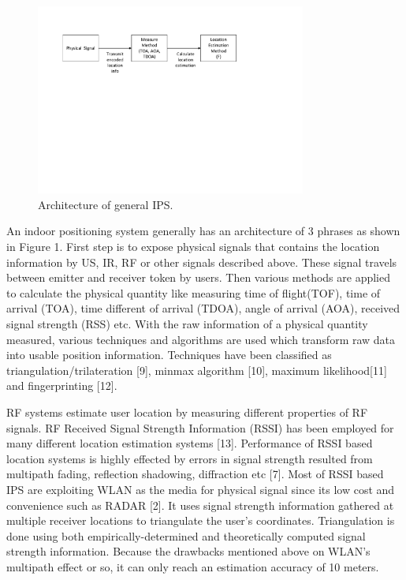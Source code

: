 \documentclass[conference]{IEEEtran}
\begin{document}
	\begin{figure}
	\centering
	\includegraphics[width=3.5in]{../img.origin/fig1.pdf}
	\caption{Architecture of general IPS.}
	\label{fig_sim}
	\end{figure}

An indoor positioning system generally has an architecture of 3 phrases as shown in Figure 1. First step is to expose physical signals that contains the location information by US, IR, RF or other signals described above. These signal travels between emitter and receiver token by users. Then various methods are applied to calculate the physical quantity like measuring time of flight(TOF), time of arrival (TOA), time different of arrival (TDOA), angle of arrival (AOA), received signal strength (RSS) etc. With the raw information of a physical quantity measured, various techniques and algorithms are used which transform raw data into usable position information. Techniques have been classified as triangulation/trilateration [9], minmax algorithm [10], maximum likelihood[11] and fingerprinting [12].


RF systems estimate user location by measuring different properties of RF signals. RF Received Signal Strength Information (RSSI) has been employed for many different location estimation systems [13]. Performance of RSSI based location systems is highly effected by errors in signal strength resulted from multipath fading, reflection shadowing, diffraction etc [7]. Most of RSSI based IPS are exploiting WLAN as the media for physical signal since its low cost and convenience such as RADAR [2]. It uses signal strength information gathered at multiple receiver
locations to triangulate the user’s coordinates. Triangulation is done using both empirically-determined and theoretically computed signal strength information. Because the drawbacks mentioned above on WLAN's multipath effect or so, it can only reach an estimation accuracy of 10 meters.
\end{document}
